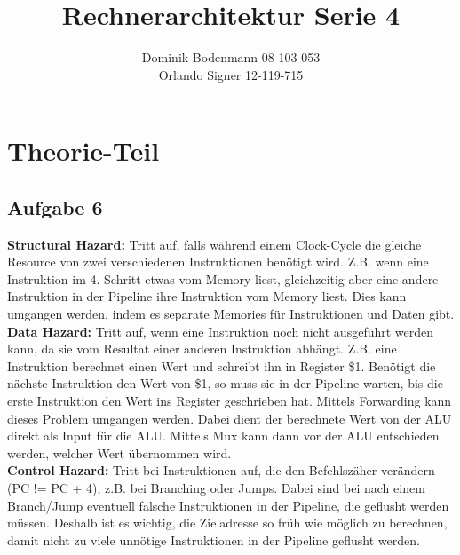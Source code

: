 \documentclass[a4paper,abstracton]{scrartcl}
\title{Rechnerarchitektur Serie 4}
\author{Dominik Bodenmann 08-103-053\\
	Orlando Signer 12-119-715\\}
\begin{document}
\maketitle

\section{Theorie-Teil}

\subsection{Aufgabe 6}
\textbf{Structural Hazard:} Tritt auf, falls während einem Clock-Cycle die gleiche Resource von zwei verschiedenen Instruktionen benötigt wird. Z.B. wenn eine Instruktion im 4. Schritt etwas vom Memory liest, gleichzeitig aber eine andere Instruktion in der Pipeline ihre Instruktion vom Memory liest. Dies kann umgangen werden, indem es separate Memories für Instruktionen und Daten gibt.\\
\textbf{Data Hazard:} Tritt auf, wenn eine Instruktion noch nicht ausgeführt werden kann, da sie vom Resultat einer anderen Instruktion abhängt. Z.B. eine Instruktion berechnet einen Wert und schreibt ihn in Register \$1. Benötigt die nächste Instruktion den Wert von \$1, so muss sie in der Pipeline warten, bis die erste Instruktion den Wert ins Register geschrieben hat. Mittels Forwarding kann dieses Problem umgangen werden. Dabei dient der berechnete Wert von der ALU direkt als Input für die ALU. Mittels Mux kann dann vor der ALU entschieden werden, welcher Wert übernommen wird. \\
\textbf{Control Hazard:} Tritt bei Instruktionen auf, die den Befehlszäher verändern (PC != PC + 4), z.B. bei Branching oder Jumps. Dabei sind bei nach einem Branch/Jump eventuell falsche Instruktionen in der Pipeline, die geflusht werden müssen. Deshalb ist es wichtig, die Zieladresse so früh wie möglich zu berechnen, damit nicht zu viele unnötige Instruktionen in der Pipeline geflusht werden.\\
\end{document}
